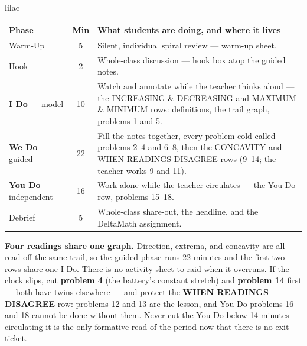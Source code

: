 \documentclass[10pt]{article}
\begin{document}
\boxguard[22]
\begin{skillbox}{lilac}
\small
\renewcommand{\arraystretch}{1.25}
\begin{tabularx}{\linewidth}{@{} l c X @{}}
\textbf{Phase} & \textbf{Min} & \textbf{What students are doing, and where it lives} \\
\midrule
Warm-Up                       & 5  & Silent, individual spiral review --- warm-up sheet. \\
Hook                          & 2  & Whole-class discussion --- hook box atop the guided notes. \\
\textbf{I Do} --- model       & 10 & Watch and annotate while the teacher thinks aloud --- the INCREASING \& DECREASING and MAXIMUM \& MINIMUM rows: definitions, the trail graph, problems 1 and 5. \\
\textbf{We Do} --- guided     & 22 & Fill the notes together, every problem cold-called --- problems 2--4 and 6--8, then the CONCAVITY and WHEN READINGS DISAGREE rows (9--14; the teacher works 9 and 11). \\
\textbf{You Do} --- independent & 16 & Work alone while the teacher circulates --- the You Do row, problems 15--18. \\
Debrief                       & 5  & Whole-class share-out, the headline, and the DeltaMath assignment. \\
\end{tabularx}

\smallskip
\textbf{Four readings share one graph.} Direction, extrema, and concavity are all read off the
same trail, so the guided phase runs 22 minutes and the first two rows share one I Do. There is
no activity sheet to raid when it overruns. If the clock slips, cut \textbf{problem 4} (the
battery's constant stretch) and \textbf{problem 14} first --- both have twins elsewhere --- and
protect the \textbf{WHEN READINGS DISAGREE} row: problems 12 and 13 are the lesson, and You Do
problems 16 and 18 cannot be done without them. Never cut the You Do below 14 minutes ---
circulating it is the only formative read of the period now that there is no exit ticket.
\end{skillbox}
\end{document}
